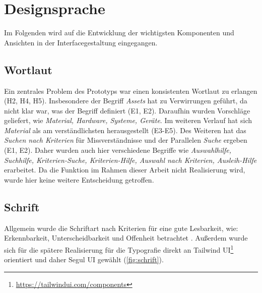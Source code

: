 \section{Designsprache}

Im Folgenden wird auf die Entwicklung der wichtigsten Komponenten und Ansichten in der
Interfacegestaltung eingegangen.

\subsection{Wortlaut}
Ein zentrales Problem des Prototyps war einen konsistenten Wortlaut zu erlangen (H2, H4, H5).
Insbesondere der Begriff \textit{Assets} hat zu Verwirrungen geführt, da nicht klar war, was der
Begriff definiert (E1, E2). Daraufhin wurden Vorschläge geliefert, wie \textit{Material, Hardware,
    Systeme, Geräte}. Im weiteren Verlauf hat sich \textit{Material} als am verständlichsten
herausgestellt (E3-E5). Des Weiteren hat das \textit{Suchen nach Kriterien} für Missverständnisse
und der Parallelen \textit{Suche} ergeben (E1, E2). Daher wurden auch hier verschiedene Begriffe wie
\textit{Auswahlhilfe, Suchhilfe, Kriterien-Suche, Kriterien-Hilfe, Auswahl nach Kriterien, Ausleih-Hilfe}
erarbeitet. Da die Funktion im Rahmen dieser Arbeit nicht Realisierung wird, wurde hier keine
weitere Entscheidung getroffen.

\subsection{Schrift}
Allgemein wurde die Schriftart nach Kriterien für eine gute Lesbarkeit, wie: Erkennbarkeit,
Unterscheidbarkeit und Offenheit betrachtet \cite{kommunikationsdesign_leserlichinfo}. Außerdem
wurde sich für die spätere Realisierung für die Typografie direkt an Tailwind
UI\footnote{\url{https://tailwindui.com/components}} orientiert und daher Segul UI gewählt (\ref{fig:schrift}).


